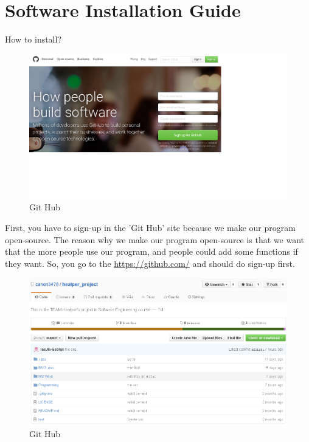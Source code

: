 \documentclass[conference]{IEEEtran}
\begin{document}
 
\section{Software Installation Guide}

How to install?

\begin{figure}[H]
\begin{center}
    \includegraphics[scale=0.33]{git1}
    \caption{Git Hub} 
\end{center}
\end{figure}

First, you have to sign-up in the 'Git Hub' site because we make our program open-source. The reason why we make our program open-source is that we want that the more people use our program, and people could add some functions if they want. So, you go to the \url{https://github.com/} and should do sign-up first.

\begin{figure}[H]
\begin{center}
    \includegraphics[scale=0.33]{git2}
    \caption{Git Hub} 
\end{center}
\end{figure}
\end{document}
